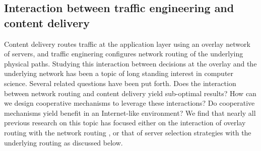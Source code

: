 \subsection{Interaction between traffic engineering and content delivery}
\label{sec:ch2-te-cdn}

Content delivery routes traffic at the application layer using an overlay network of servers, and traffic enginering configures network routing of the underlying physical paths. Studying this interaction between decisions at the overlay and the underlying network has been a topic of long standing interest in computer science. Several related questions have been put forth. Does the interaction between network routing and content delivery yield sub-optimal results? How can we design cooperative mechanisms to leverage these interactions? Do cooperative mechanisms yield benefit in an Internet-like environment? We find that nearly all previous research on this topic has focused either on the interaction of overlay routing with the network routing \cite{Roughgarden,selfishQiu}, or that of server selection strategies with the underlying routing  \cite{Jiang2009,JohariGameTheory, CATE, P4P} as discussed below. 



